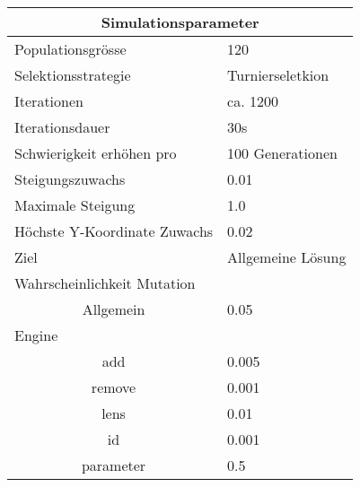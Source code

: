
\begin{tabular}{ | l | l | }

  \hline
  \multicolumn{2}{|c|}{Simulationsparameter} \\
  \hline
  Populationsgrösse & 120 \\ \hline
  Selektionsstrategie & Turnierseletkion \\ \hline
  Iterationen & ca. 1200 \\ \hline
  Iterationsdauer & 30s \\ \hline
  Schwierigkeit erhöhen pro & 100 Generationen \\ \hline
  Steigungszuwachs & 0.01 \\ \hline
  Maximale Steigung & 1.0 \\ \hline
  Höchste Y-Koordinate Zuwachs  & 0.02 \\ \hline
  Ziel & Allgemeine Lösung \\ \hline
  \multicolumn{2}{|l|}{Wahrscheinlichkeit Mutation}\\ \hline
  \multicolumn{1}{|c|}{Allgemein} & 0.05 \\ \hline
  Engine &  \\ \hline
  \multicolumn{1}{|c|}{add} & 0.005 \\ \hline
  \multicolumn{1}{|c|}{remove} & 0.001 \\ \hline
  \multicolumn{1}{|c|}{lens} & 0.01 \\ \hline
  \multicolumn{1}{|c|}{id} & 0.001 \\ \hline
  \multicolumn{1}{|c|}{parameter} & 0.5 \\ \hline

\end{tabular}
